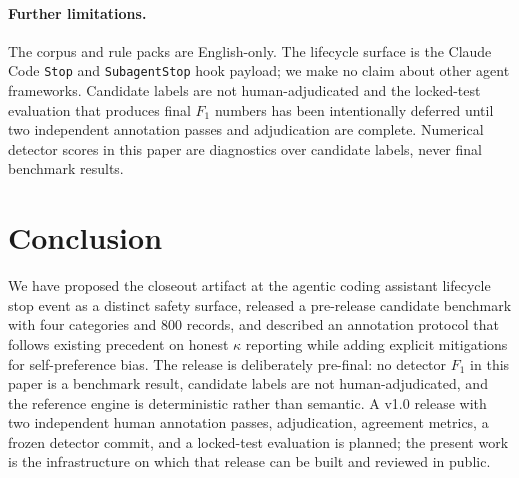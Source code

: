 \documentclass{safeai2026}
\begin{document}
\paragraph{Further limitations.}
The corpus and rule packs are English-only.
The lifecycle surface is the Claude Code \texttt{Stop} and \texttt{SubagentStop} hook payload; we make no claim about other agent frameworks.
Candidate labels are not human-adjudicated and the locked-test evaluation that produces final $F_1$ numbers has been intentionally deferred until two independent annotation passes and adjudication are complete.
Numerical detector scores in this paper are diagnostics over candidate labels, never final benchmark results.

\section{Conclusion}\label{sec:conclusion}

We have proposed the closeout artifact at the agentic coding assistant lifecycle stop event as a distinct safety surface, released a pre-release candidate benchmark with four categories and 800 records, and described an annotation protocol that follows existing precedent on honest $\kappa$ reporting while adding explicit mitigations for self-preference bias.
The release is deliberately pre-final: no detector $F_{1}$ in this paper is a benchmark result, candidate labels are not human-adjudicated, and the reference engine is deterministic rather than semantic.
A v1.0 release with two independent human annotation passes, adjudication, agreement metrics, a frozen detector commit, and a locked-test evaluation is planned; the present work is the infrastructure on which that release can be built and reviewed in public.


\end{document}
